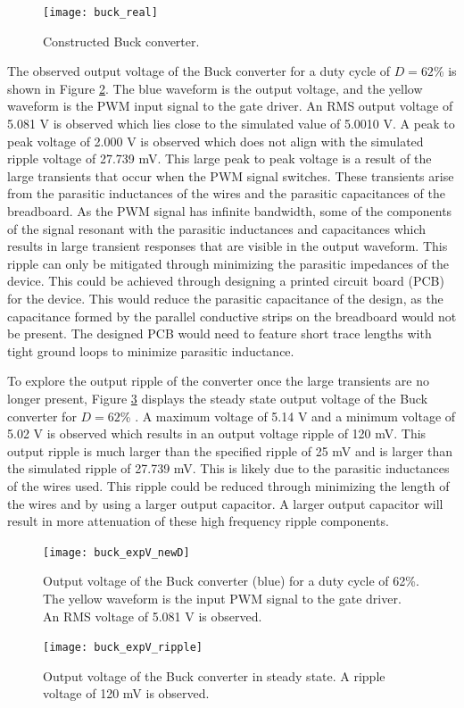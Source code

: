 \documentclass[12pt,twoside]{scrartcl}
\begin{document}
\begin{figure}[h]
    \centering
    \texttt{[image: buck\_real]}
    \caption{Constructed Buck converter.}
    \label{fig:buck_real}
\end{figure}

\noindent The observed output voltage of the Buck converter for a duty cycle of $D = 62$\% is shown in Figure \ref{fig:buck_expV_newD}. The blue waveform is the output voltage, and the yellow waveform is the PWM input signal to the gate driver. An RMS output voltage of 5.081 V is observed which lies close to the simulated value of 5.0010 V. A peak to peak voltage of 2.000 V is observed which does not align with the simulated ripple voltage of 27.739 mV. This large peak to peak voltage is a result of the large transients that occur when the PWM signal switches. These transients arise from the parasitic inductances of the wires and the parasitic capacitances of the breadboard. As the PWM signal has infinite bandwidth, some of the components of the signal resonant with the parasitic inductances and capacitances which results in large transient responses that are visible in the output waveform. This ripple can only be mitigated through minimizing the parasitic impedances of the device. This could be achieved through designing a printed circuit board (PCB) for the device. This would reduce the parasitic capacitance of the design, as the capacitance formed by the parallel conductive strips on the breadboard would not be present.  The designed PCB would need to feature short trace lengths with tight ground loops to minimize parasitic inductance.\par
\vspace{5mm}
\noindent To explore the output ripple of the converter once the large transients are no longer present, Figure \ref{fig:buck_expV_ripple} displays the steady state output voltage of the Buck converter for $D = 62$\% . A maximum voltage of 5.14 V and a minimum voltage of 5.02 V is observed which results in an output voltage ripple of 120 mV. This output ripple is much larger than the specified ripple of 25 mV and is larger than the simulated ripple of 27.739 mV.  This is likely due to the parasitic inductances of the wires used. This ripple could be reduced through minimizing the length of the wires and by using a larger output capacitor. A larger output capacitor will result in more attenuation of these high frequency ripple components.\par
\newpage
\begin{figure}[h!]
    \centering
    \texttt{[image: buck\_expV\_newD]}
    \caption{Output voltage of the Buck converter (blue) for a duty cycle of 62\%. The yellow waveform is the input PWM signal to the gate driver. An RMS voltage of 5.081 V is observed.}
    \label{fig:buck_expV_newD}
\end{figure}
\begin{figure}[h!]
    \centering
    \texttt{[image: buck\_expV\_ripple]}
    \caption{Output voltage of the Buck converter in steady state. A ripple voltage of 120 mV is observed.}
    \label{fig:buck_expV_ripple}
\end{figure}
\end{document}
